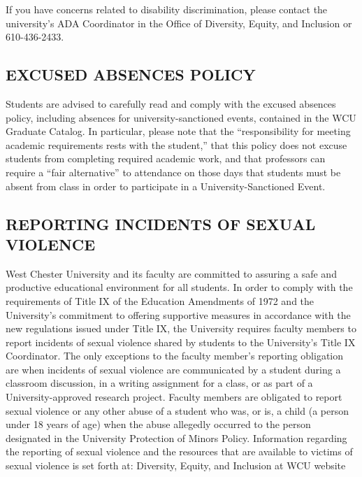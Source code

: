 \documentclass[
]{article}
\begin{document}
If you have concerns related to disability discrimination, please
contact the university's ADA Coordinator in the Office of Diversity,
Equity, and Inclusion or 610-436-2433.

\hypertarget{excused-absences-policy}{%
\subsection{EXCUSED ABSENCES POLICY}\label{excused-absences-policy}}

Students are advised to carefully read and comply with the excused
absences policy, including absences for university-sanctioned events,
contained in the WCU Graduate Catalog. In particular, please note that
the ``responsibility for meeting academic requirements rests with the
student,'' that this policy does not excuse students from completing
required academic work, and that professors can require a ``fair
alternative'' to attendance on those days that students must be absent
from class in order to participate in a University-Sanctioned Event.

\hypertarget{reporting-incidents-of-sexual-violence}{%
\subsection{REPORTING INCIDENTS OF SEXUAL
VIOLENCE}\label{reporting-incidents-of-sexual-violence}}

West Chester University and its faculty are committed to assuring a safe
and productive educational environment for all students. In order to
comply with the requirements of Title IX of the Education Amendments of
1972 and the University's commitment to offering supportive measures in
accordance with the new regulations issued under Title IX, the
University requires faculty members to report incidents of sexual
violence shared by students to the University's Title IX Coordinator.
The only exceptions to the faculty member's reporting obligation are
when incidents of sexual violence are communicated by a student during a
classroom discussion, in a writing assignment for a class, or as part of
a University-approved research project. Faculty members are obligated to
report sexual violence or any other abuse of a student who was, or is, a
child (a person under 18 years of age) when the abuse allegedly occurred
to the person designated in the University Protection of Minors Policy.
Information regarding the reporting of sexual violence and the resources
that are available to victims of sexual violence is set forth at:
Diversity, Equity, and Inclusion at WCU website
\end{document}
